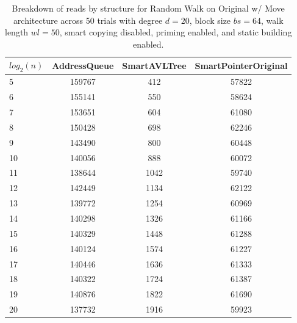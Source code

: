 \begin{table}[]
\centering
\begin{tabular}{|l|c|c|c|}
$log_2(n)$ & AddressQueue & SmartAVLTree & SmartPointerOriginal \\ \hline
5 & 159767 & 412 & 57822 \\ \hline
6 & 155141 & 550 & 58624 \\ \hline
7 & 153651 & 604 & 61080 \\ \hline
8 & 150428 & 698 & 62246 \\ \hline
9 & 143490 & 800 & 60448 \\ \hline
10 & 140056 & 888 & 60072 \\ \hline
11 & 138644 & 1042 & 59740 \\ \hline
12 & 142449 & 1134 & 62122 \\ \hline
13 & 139772 & 1254 & 60969 \\ \hline
14 & 140298 & 1326 & 61166 \\ \hline
15 & 140329 & 1448 & 61288 \\ \hline
16 & 140124 & 1574 & 61227 \\ \hline
17 & 140446 & 1636 & 61333 \\ \hline
18 & 140322 & 1724 & 61387 \\ \hline
19 & 140876 & 1822 & 61690 \\ \hline
20 & 137732 & 1916 & 59923 \\ \hline
\end{tabular}
\caption{Breakdown of reads by structure for Random Walk on Original w/ Move architecture across 50 trials with degree $d=20$, block size $bs=64$, walk length $wl=50$, smart copying disabled, priming enabled, and static building enabled.}
    \label{tab:reads_by_structure_rw_d20_bs64_trials50_copiesfalse_primetrue_staticinsertiontrue_wl50_ptoriginal_movetrue}
\end{table}

